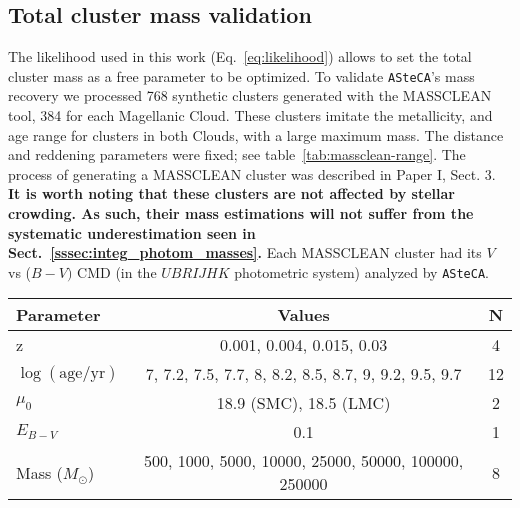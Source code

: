 \documentclass{aa}
\begin{document}
\begin{appendix}

\section{Total cluster mass validation}
\label{apdx:mass_valid}

The likelihood used in this work (Eq.~\ref{eq:likelihood}) allows
to set the total cluster mass as a free parameter to be optimized.
To validate \texttt{ASteCA}'s mass recovery we processed 768 synthetic
clusters generated with the MASSCLEAN tool, 384 for each Magellanic Cloud.
%
These clusters imitate the metallicity, and age range for clusters in
both Clouds, with a large maximum mass. The distance and reddening parameters
were fixed; see table~\ref{tab:massclean-range}.
The process of generating a MASSCLEAN cluster was described in Paper I, Sect. 3.
\textbf{It is worth noting that these clusters are not affected by stellar
crowding. As such, their mass estimations will not suffer from the systematic
underestimation seen in Sect.~\ref{sssec:integ_photom_masses}.}
%
Each MASSCLEAN cluster had its $V$ vs ($B-V)$ CMD (in the $UBRIJHK$ photometric
system) analyzed by \texttt{ASteCA}.

\begin{table*}
\centering
\caption{Parameter values used to generate the set of 768 MASSCLEAN clusters.}
\label{tab:massclean-range}
\begin{tabular}{lcc}
\hline\hline
 Parameter & Values & N\\
\hline
z & 0.001, 0.004, 0.015, 0.03 & 4\\
$\log\mathrm{(age/yr)}$ & 7, 7.2, 7.5, 7.7, 8, 8.2, 8.5, 8.7, 9, 9.2, 9.5, 9.7 &
12\\
$\mu_0$ & 18.9 (SMC), 18.5 (LMC) & 2\\
$E_{B-V}$ & 0.1 & 1\\
Mass ($M_{\odot}$) & 500, 1000, 5000, 10000, 25000, 50000, 100000, 250000 & 8\\
\hline
\end{tabular}
\end{table*}


\end{appendix}
\end{document}
